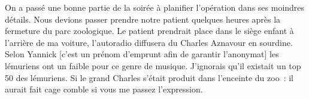 On a passé une bonne partie de la soirée à planifier l’opération dans ses moindres détails. Nous devions passer prendre notre patient quelques heures après la fermeture du parc zoologique. Le patient prendrait place dans le siège enfant à l’arrière de ma voiture, l’autoradio diffusera du Charles Aznavour en sourdine. Selon Yannick [c’est un prénom d’emprunt afin de garantir l’anonymat] les lémuriens ont un faible pour ce genre de musique. J’ignorais qu’il existait un top 50 des lémuriens. Si le grand Charles s’était produit dans l’enceinte du zoo : il aurait fait cage comble si vous me passez l’expression. 
